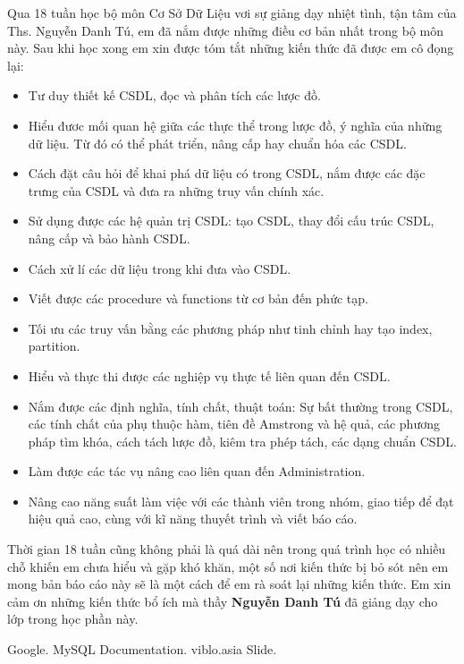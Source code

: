 \documentclass[12pt,a4paper]{report}
\begin{document}
	Qua 18 tuần học bộ môn Cơ Sở Dữ Liệu vơi sự giảng dạy nhiệt tình, tận tâm của Ths. Nguyễn Danh Tú, em đã nắm được những điều cơ bản nhất trong bộ môn này. Sau khi học xong em xin được tóm tắt những kiến thức đã được em cô đọng lại:
	\begin{itemize}
		\item Tư duy thiết kế CSDL, đọc và phân tích các lược đồ.
		\item Hiểu đươc mối quan hệ giữa các thực thể trong lược đồ, ý nghĩa của những dữ liệu. Từ đó có thể phát triển, nâng cấp hay chuẩn hóa các CSDL.
		\item Cách đặt câu hỏi để khai phá dữ liệu có trong CSDL, nắm được các đặc trưng của CSDL và đưa ra những truy vấn chính xác.
		\item Sử dụng được các hệ quản trị CSDL: tạo CSDL, thay đổi cấu trúc CSDL, nâng cấp và bảo hành CSDL.
		\item Cách xử lí các dữ liệu trong khi đưa vào CSDL.
		\item Viết được các procedure và functions từ cơ bản đến phức tạp.
		\item Tối ưu các truy vấn bằng các phương pháp như tinh chỉnh hay tạo index, partition.
		\item Hiểu và thực thi được các nghiệp vụ thực tế liên quan đến CSDL.
		\item Nắm được các định nghĩa, tính chất, thuật toán: Sự bất thường trong CSDL, các tính chất của phụ thuộc hàm, tiên đề Amstrong và hệ quả, các phương pháp tìm khóa, cách tách lược đồ, kiêm tra phép tách, các dạng chuẩn CSDL.
		\item Làm được các tác vụ nâng cao liên quan đến Administration.
		\item Nâng cao năng suất làm việc với các thành viên trong nhóm, giao tiếp để đạt hiệu quả cao, cùng với kĩ năng thuyết trình và viết báo cáo.
	\end{itemize}
	
	Thời gian 18 tuần cũng không phải là quá dài nên trong quá trình học có nhiều chỗ khiến em chưa hiểu và gặp khó khăn, một số nơi kiến thức bị bỏ sót nên em mong bản báo cáo này sẽ là một cách để em rà soát lại những kiến thức. Em xin cảm ơn những kiến thức bổ ích mà thầy {\bf Nguyễn Danh Tú} đã giảng dạy cho lớp trong học phần này.


\begin{thebibliography}{99}               %

  Google.
 MySQL Documentation.
 viblo.asia
 Slide.


\end{thebibliography}
\end{document}
